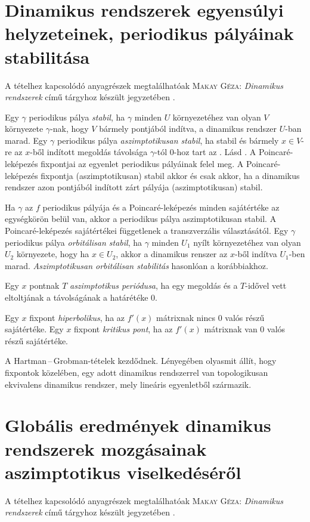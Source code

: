 \documentclass[DIV=15,appendixprefix]{scrreprt}
\theoremstyle{definition}
\theoremstyle{remark}
\begin{document}
\section{Dinamikus rendszerek egyensúlyi helyzeteinek, periodikus pályáinak stabilitása}
A tételhez kapcsolódó anyagrészek megtalálhatóak \textsc{Makay Géza}:
\emph{Dinamikus rendszerek} című tárgyhoz készült jegyzetében \cite{Makay}.

Egy $\gamma$ periodikus pálya \emph{stabil}, ha $\gamma$ minden $U$ környezetéhez van olyan $V$
környezete $\gamma$-nak, hogy $V$ bármely pontjából indítva, a dinamikus rendszer $U$-ban marad. Egy
$\gamma$ periodikus pálya \emph{aszimptotikusan stabil}, ha stabil és bármely $x\in V$-re az
$ x $-ből indított megoldás távolsága $ \gamma $-tól 0-hoz tart az .
%
Lásd \cite[33--34.~oldal]{Makay}.
A Poincaré-leképezés fixpontjai az egyenlet periodikus pályáinak felel meg. A Poincaré-leképezés
fixpontja (aszimptotikusan) stabil akkor és csak akkor, ha a dinamikus rendszer azon pontjából
indított zárt pályája (aszimptotikusan) stabil.

Ha $\gamma$ az $f$ periodikus pályája és a Poincaré-leképezés minden sajátértéke az egységkörön
belül van, akkor a periodikus pálya aszimptotikusan stabil. A Poincaré-leképezés sajátértékei
függetlenek a transzverzális választásától.
%
Egy $\gamma$ periodikus pálya \emph{orbitálisan stabil}, ha $\gamma$ minden $ U_1 $ nyílt
környezetéhez van olyan $ U_2 $ környezete, hogy ha $x\in U_2$, akkor a dinamikus renszer az $x$-ből
indítva $U_1$-ben marad. \emph{Aszimptotikusan orbitálisan stabilitás} hasonlóan a korábbiakhoz.

Egy $x$ pontnak $T$ \emph{aszimptotikus periódusa}, ha egy megoldás és a $T$-idővel vett eltoltjának
a távolságának a határétéke 0.

Egy $x$ fixpont \emph{hiperbolikus}, ha az $f'\left( x \right) $ mátrixnak nincs 0 valós részű
sajátértéke. Egy $x$ fixpont \emph{kritikus pont}, ha az $ f' \left( x \right)  $ mátrixnak van 0
valós részű sajátértéke.

A Hartman\,--\,Grobman-tételek \cite[52.~oldalától]{Makay} kezdődnek. Lényegében olyasmit állít,
hogy fixpontok közelében, egy adott dinamikus rendszerrel van topologikusan ekvivalens dinamikus
rendszer, mely lineáris egyenletből származik.
\section{Globális eredmények dinamikus rendszerek mozgásainak aszimptotikus viselkedéséről}
%
A tételhez kapcsolódó anyagrészek megtalálhatóak \textsc{Makay Géza}:
\emph{Dinamikus rendszerek} című tárgyhoz készült jegyzetében \cite{Makay}.
\end{document}
